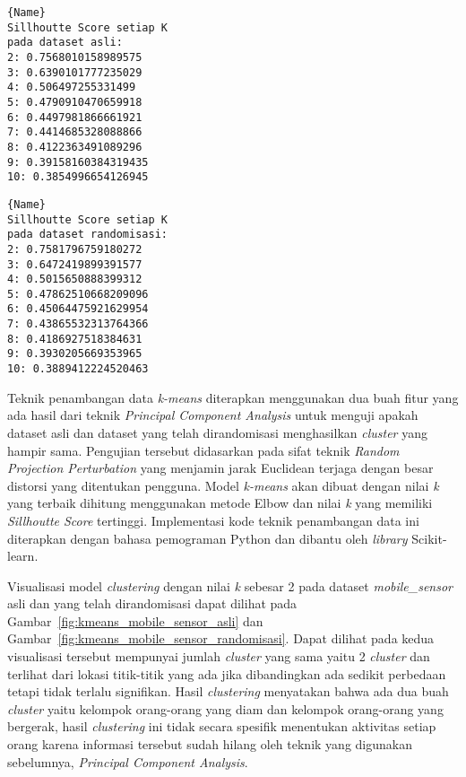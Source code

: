 \noindent\begin{minipage}{.44\textwidth}
\begin{lstlisting}[caption=Sillhoutte Score Dataset Asli,frame=tlrb, label=mobile_sensor_siluet_asli]{Name}
Sillhoutte Score setiap K
pada dataset asli: 
2: 0.7568010158989575
3: 0.6390101777235029
4: 0.506497255331499
5: 0.4790910470659918
6: 0.4497981866661921
7: 0.4414685328088866
8: 0.4122363491089296
9: 0.39158160384319435
10: 0.3854996654126945
\end{lstlisting}
\end{minipage}\hfill
\begin{minipage}{.44\textwidth}
\begin{lstlisting}[caption=Sillhoutte Score Dataset Randomisasi,frame=tlrb, label=mobile_sensor_siluet_randomisasi]{Name}
Sillhoutte Score setiap K
pada dataset randomisasi: 
2: 0.7581796759180272
3: 0.6472419899391577
4: 0.5015650888399312
5: 0.47862510668209096
6: 0.45064475921629954
7: 0.43865532313764366
8: 0.4186927518384631
9: 0.3930205669353965
10: 0.3889412224520463
\end{lstlisting}
\end{minipage}

Teknik penambangan data \textit{k-means} diterapkan menggunakan dua buah fitur yang ada hasil dari teknik \textit{Principal Component Analysis} untuk menguji apakah dataset asli dan dataset yang telah dirandomisasi menghasilkan \textit{cluster} yang hampir sama. Pengujian tersebut didasarkan pada sifat teknik \textit{Random Projection Perturbation} yang menjamin jarak Euclidean terjaga dengan besar distorsi yang ditentukan pengguna. Model \textit{k-means} akan dibuat dengan nilai \textit{k} yang terbaik dihitung menggunakan metode Elbow dan nilai \textit{k} yang memiliki \textit{Sillhoutte Score} tertinggi. Implementasi kode teknik penambangan data ini diterapkan dengan bahasa pemograman Python dan dibantu oleh \textit{library} Scikit-learn. 

Visualisasi model \textit{clustering} dengan nilai \textit{k} sebesar 2 pada dataset \textit{mobile\_sensor} asli dan yang telah dirandomisasi dapat dilihat pada Gambar~\ref{fig:kmeans_mobile_sensor_asli} dan Gambar~\ref{fig:kmeans_mobile_sensor_randomisasi}. Dapat dilihat pada kedua visualisasi tersebut mempunyai jumlah \textit{cluster} yang sama yaitu 2 \textit{cluster} dan terlihat dari lokasi titik-titik yang ada jika dibandingkan ada sedikit perbedaan tetapi tidak terlalu signifikan. Hasil \textit{clustering} menyatakan bahwa ada dua buah \textit{cluster} yaitu kelompok orang-orang yang diam dan kelompok orang-orang yang bergerak, hasil \textit{clustering} ini tidak secara spesifik menentukan aktivitas setiap orang karena informasi tersebut sudah hilang oleh teknik yang digunakan sebelumnya, \textit{Principal Component Analysis}. 
	
